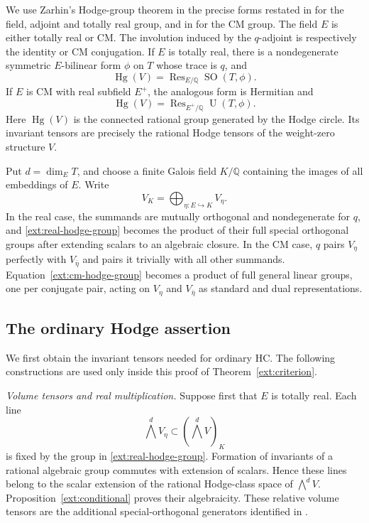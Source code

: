 \documentclass[11pt]{amsart}
\newcommand{\Q}{\mathbb Q}
\DeclareMathOperator{\Hg}{Hg}
\DeclareMathOperator{\SO}{SO}
\theoremstyle{definition}
\theoremstyle{remark}
\numberwithin{equation}{section}
\begin{document}
We use Zarhin's Hodge-group theorem \cite{Zarhin1983} in the precise
forms restated in \cite[Section~2.1 and Theorem~2.8]{VanGeemenReal}
for the field, adjoint and totally real group, and in
\cite[Section~2.1]{VarescoPowers} for the CM group.  The field
$E$ is either totally real or CM.  The involution induced by the
$q$-adjoint is respectively the identity or CM conjugation.  If
$E$ is totally real, there is a nondegenerate symmetric
$E$-bilinear form $\phi$ on $T$ whose trace is $q$, and
\begin{equation}\label{ext:real-hodge-group}
 \Hg(V)=\operatorname{Res}_{E/\Q}\SO(T,\phi).
\end{equation}
If $E$ is CM with real subfield $E^+$, the analogous form is
Hermitian and
\begin{equation}\label{ext:cm-hodge-group}
 \Hg(V)=\operatorname{Res}_{E^+/\Q}\operatorname{U}(T,\phi).
\end{equation}
Here $\Hg(V)$ is the connected rational group generated by the
Hodge circle.  Its invariant tensors are precisely the rational
Hodge tensors of the weight-zero structure $V$.

Put $d=\dim_E T$, and choose a finite Galois field $K/\Q$ containing
the images of all embeddings of $E$.  Write
\begin{equation}\label{ext:eigenspaces}
 V_K=\bigoplus_{\eta:E\hookrightarrow K}V_\eta.
\end{equation}
In the real case, the summands are mutually orthogonal and
nondegenerate for $q$, and \eqref{ext:real-hodge-group} becomes the
product of their full special orthogonal groups after extending
scalars to an algebraic closure.  In the CM case, $q$ pairs
$V_\eta$ perfectly with $V_{\bar\eta}$ and pairs it trivially with
all other summands.  Equation~\eqref{ext:cm-hodge-group} becomes a
product of full general linear groups, one per conjugate pair,
acting on $V_\eta$ and $V_{\bar\eta}$ as standard and dual
representations.


\subsection{The ordinary Hodge assertion}

We first obtain the invariant tensors needed for ordinary HC.  The
following constructions are used only inside this proof of
Theorem~\ref{ext:criterion}.

\emph{Volume tensors and real multiplication.}
Suppose first that $E$ is totally real.  Each line
\[
 \bigwedge^dV_\eta\subset(\bigwedge^dV)_K
\]
is fixed by the group in \eqref{ext:real-hodge-group}.  Formation
of invariants of a rational algebraic group commutes with
extension of scalars.  Hence these lines belong to the scalar
extension of the rational Hodge-class space of $\bigwedge^dV$.
Proposition~\ref{ext:conditional} proves their algebraicity.
These relative volume tensors are the additional special-orthogonal
generators identified in \cite[Theorem~2.16]{VarescoPowers}.
\end{document}
